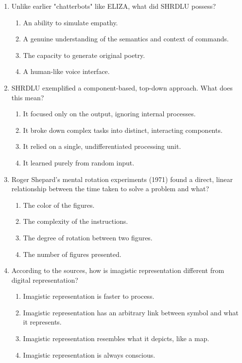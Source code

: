\documentclass{article}
\begin{document}
\begin{enumerate}[label=\arabic*.]
\item Unlike earlier "chatterbots" like ELIZA, what did SHRDLU possess?
\begin{enumerate}[label=(\alph*)]
    \item An ability to simulate empathy.
    \item A genuine understanding of the semantics and context of commands.
    \item The capacity to generate original poetry.
    \item A human-like voice interface.
\end{enumerate}

\item SHRDLU exemplified a component-based, top-down approach. What does this mean?
\begin{enumerate}[label=(\alph*)]
    \item It focused only on the output, ignoring internal processes.
    \item It broke down complex tasks into distinct, interacting components.
    \item It relied on a single, undifferentiated processing unit.
    \item It learned purely from random input.
\end{enumerate}

\item Roger Shepard's mental rotation experiments (1971) found a direct, linear relationship between the time taken to solve a problem and what?
\begin{enumerate}[label=(\alph*)]
    \item The color of the figures.
    \item The complexity of the instructions.
    \item The degree of rotation between two figures.
    \item The number of figures presented.
\end{enumerate}

\item According to the sources, how is imagistic representation different from digital representation?
\begin{enumerate}[label=(\alph*)]
    \item Imagistic representation is faster to process.
    \item Imagistic representation has an arbitrary link between symbol and what it represents.
    \item Imagistic representation resembles what it depicts, like a map.
    \item Imagistic representation is always conscious.
\end{enumerate}


\end{enumerate}
\end{document}
